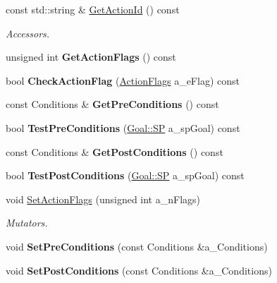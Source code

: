 \begin{DoxyCompactItemize}
const std\+::string \& \hyperlink{class_i_action_ae2a71820d5dcf4e34c60853947872379}{Get\+Action\+Id} () const
\begin{DoxyCompactList}\small\item\em Accessors. \end{DoxyCompactList}\item 
\mbox{\label{class_i_action_aaef8dc9176609fce9ae82c6b48abe008}} 
unsigned int {\bfseries Get\+Action\+Flags} () const
\item 
\mbox{\label{class_i_action_a10ba678d11073fdc2d62330262c907a2}} 
bool {\bfseries Check\+Action\+Flag} (\hyperlink{class_i_action_aeeeed1494a57b36c5c3694d6daa845ee}{Action\+Flags} a\+\_\+e\+Flag) const
\item 
\mbox{\label{class_i_action_ac7878a2f117d055aeefafb247b14ecb2}} 
const Conditions \& {\bfseries Get\+Pre\+Conditions} () const
\item 
\mbox{\label{class_i_action_a0f92134074c76f84aee2ebe6b6bfd542}} 
bool {\bfseries Test\+Pre\+Conditions} (\hyperlink{class_goal_a818ae12a4d1f28bd433dab2a830a390e}{Goal\+::\+SP} a\+\_\+sp\+Goal) const
\item 
\mbox{\label{class_i_action_a615932e369704999d1d9e82d14d3f851}} 
const Conditions \& {\bfseries Get\+Post\+Conditions} () const
\item 
\mbox{\label{class_i_action_ab5b3c9012eb533994099c5e17af2bcbe}} 
bool {\bfseries Test\+Post\+Conditions} (\hyperlink{class_goal_a818ae12a4d1f28bd433dab2a830a390e}{Goal\+::\+SP} a\+\_\+sp\+Goal) const
\item 
\mbox{\label{class_i_action_afb5bf930b563d66880f002126ae4d2f9}} 
void \hyperlink{class_i_action_afb5bf930b563d66880f002126ae4d2f9}{Set\+Action\+Flags} (unsigned int a\+\_\+n\+Flags)
\begin{DoxyCompactList}\small\item\em Mutators. \end{DoxyCompactList}\item 
\mbox{\label{class_i_action_a328fb2dbdeaaac4abd0fe32a05b45a78}} 
void {\bfseries Set\+Pre\+Conditions} (const Conditions \&a\+\_\+\+Conditions)
\item 
\mbox{\label{class_i_action_a224646f44a86bacb02c0a1838e14665c}} 
void {\bfseries Set\+Post\+Conditions} (const Conditions \&a\+\_\+\+Conditions)
\end{DoxyCompactItemize}


